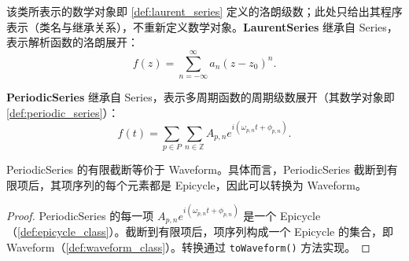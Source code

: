 \begin{definition}[洛朗级数程序表示]\label{def:laurent_series_class}
该类所表示的数学对象即 \cref{def:laurent_series} 定义的洛朗级数；此处只给出其程序表示（类名与继承关系），不重新定义数学对象。\textbf{LaurentSeries} 继承自 Series，表示解析函数的洛朗展开：
\[
f(z) = \sum_{n=-\infty}^{\infty} a_n (z - z_0)^n.
\]
\end{definition}

\begin{definition}[周期级数程序表示]\label{def:periodic_series_class}
\textbf{PeriodicSeries} 继承自 Series，表示多周期函数的周期级数展开（其数学对象即 \cref{def:periodic_series}）：
\[
f(t) = \sum_{p \in P} \sum_{n \in \mathbb{Z}} A_{p,n} e^{i(\omega_{p,n} t + \phi_{p,n})}.
\]
\end{definition}

\begin{proposition}\label{prop:series_waveform_relation}
PeriodicSeries 的有限截断等价于 Waveform。具体而言，PeriodicSeries 截断到有限项后，其项序列的每个元素都是 Epicycle，因此可以转换为 Waveform。
\end{proposition}

\begin{proof}
PeriodicSeries 的每一项 $A_{p,n} e^{i(\omega_{p,n} t + \phi_{p,n})}$ 是一个 Epicycle（\cref{def:epicycle_class}）。截断到有限项后，项序列构成一个 Epicycle 的集合，即 Waveform（\cref{def:waveform_class}）。转换通过 \texttt{toWaveform()} 方法实现。
\end{proof}

\newpage

